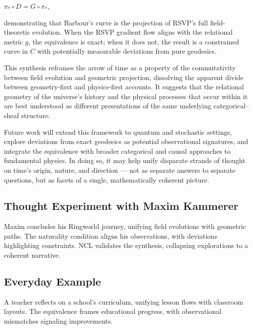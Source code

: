 \documentclass[11pt]{article}
\theoremstyle{plain}
\theoremstyle{definition}
\begin{document}
$\pi_* \circ D = G \circ \pi_*$,

demonstrating that Barbour’s curve is the projection of RSVP’s full field-theoretic evolution. When the RSVP gradient flow aligns with the relational metric $g$, the equivalence is exact; when it does not, the result is a constrained curve in $C$ with potentially measurable deviations from pure geodesics.

This synthesis reframes the arrow of time as a property of the commutativity between field evolution and geometric projection, dissolving the apparent divide between geometry-first and physics-first accounts. It suggests that the relational geometry of the universe’s history and the physical processes that occur within it are best understood as different presentations of the same underlying categorical–sheaf structure.

Future work will extend this framework to quantum and stochastic settings, explore deviations from exact geodesics as potential observational signatures, and integrate the equivalence with broader categorical and causal approaches to fundamental physics. In doing so, it may help unify disparate strands of thought on time’s origin, nature, and direction — not as separate answers to separate questions, but as facets of a single, mathematically coherent picture.

\subsection{Thought Experiment with Maxim Kammerer}
Maxim concludes his Ringworld journey, unifying field evolutions with geometric paths. The naturality condition aligns his observations, with deviations highlighting constraints. NCL validates the synthesis, collapsing explorations to a coherent narrative.

\subsection{Everyday Example}
A teacher reflects on a school's curriculum, unifying lesson flows with classroom layouts. The equivalence frames educational progress, with observational mismatches signaling improvements.



\end{document}
